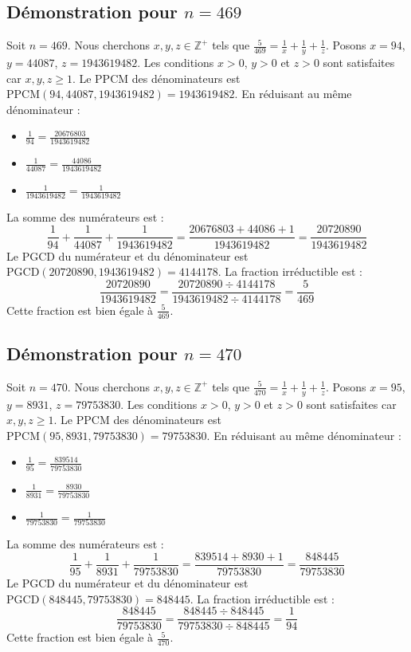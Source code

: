 \documentclass[11pt,a4paper]{article}
\begin{document}
\subsection{Démonstration pour $n = 469$}
Soit $n = 469$. Nous cherchons $x, y, z \in \mathbb{Z}^{+}$ tels que $\frac{5}{469} = \frac{1}{x} + \frac{1}{y} + \frac{1}{z}$.
Posons $x = 94$, $y = 44087$, $z = 1943619482$.
Les conditions $x > 0$, $y > 0$ et $z > 0$ sont satisfaites car $x, y, z \geq 1$.
Le PPCM des dénominateurs est $\text{PPCM}(94, 44087, 1943619482) = 1943619482$.
En réduisant au même dénominateur :
\begin{itemize}
    \item $\frac{1}{94} = \frac{20676803}{1943619482}$
    \item $\frac{1}{44087} = \frac{44086}{1943619482}$
    \item $\frac{1}{1943619482} = \frac{1}{1943619482}$
\end{itemize}
La somme des numérateurs est :
$$ \frac{1}{94} + \frac{1}{44087} + \frac{1}{1943619482} = \frac{20676803 + 44086 + 1}{1943619482} = \frac{20720890}{1943619482} $$
Le PGCD du numérateur et du dénominateur est $\text{PGCD}(20720890, 1943619482) = 4144178$.
La fraction irréductible est :
$$ \frac{20720890}{1943619482} = \frac{20720890 \div 4144178}{1943619482 \div 4144178} = \frac{5}{469} $$
Cette fraction est bien égale à $\frac{5}{469}$.

\subsection{Démonstration pour $n = 470$}
Soit $n = 470$. Nous cherchons $x, y, z \in \mathbb{Z}^{+}$ tels que $\frac{5}{470} = \frac{1}{x} + \frac{1}{y} + \frac{1}{z}$.
Posons $x = 95$, $y = 8931$, $z = 79753830$.
Les conditions $x > 0$, $y > 0$ et $z > 0$ sont satisfaites car $x, y, z \geq 1$.
Le PPCM des dénominateurs est $\text{PPCM}(95, 8931, 79753830) = 79753830$.
En réduisant au même dénominateur :
\begin{itemize}
    \item $\frac{1}{95} = \frac{839514}{79753830}$
    \item $\frac{1}{8931} = \frac{8930}{79753830}$
    \item $\frac{1}{79753830} = \frac{1}{79753830}$
\end{itemize}
La somme des numérateurs est :
$$ \frac{1}{95} + \frac{1}{8931} + \frac{1}{79753830} = \frac{839514 + 8930 + 1}{79753830} = \frac{848445}{79753830} $$
Le PGCD du numérateur et du dénominateur est $\text{PGCD}(848445, 79753830) = 848445$.
La fraction irréductible est :
$$ \frac{848445}{79753830} = \frac{848445 \div 848445}{79753830 \div 848445} = \frac{1}{94} $$
Cette fraction est bien égale à $\frac{5}{470}$.
\end{document}
